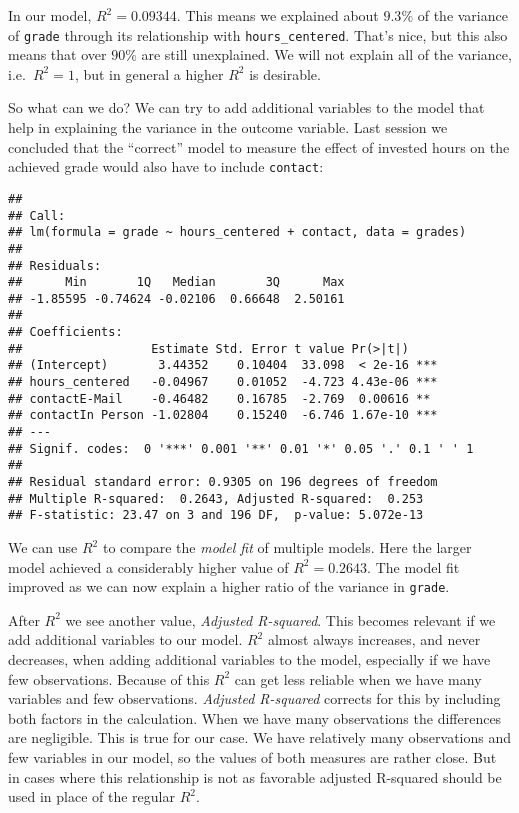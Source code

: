 \documentclass[
]{book}
\begin{document}
In our model, \(R^2 = 0.09344\). This means we explained about \(9.3\%\) of the
variance of \texttt{grade} through its relationship with \texttt{hours\_centered}. That's nice,
but this also means that over \(90\%\) are still unexplained. We will not explain
all of the variance, i.e.~\(R^2 = 1\), but in general a higher \(R^2\) is desirable.

So what can we do? We can try to add additional variables to the model that help
in explaining the variance in the outcome variable. Last session we concluded
that the ``correct'' model to measure the effect of invested hours on the achieved
grade would also have to include \texttt{contact}:

\begin{verbatim}
## 
## Call:
## lm(formula = grade ~ hours_centered + contact, data = grades)
## 
## Residuals:
##      Min       1Q   Median       3Q      Max 
## -1.85595 -0.74624 -0.02106  0.66648  2.50161 
## 
## Coefficients:
##                  Estimate Std. Error t value Pr(>|t|)    
## (Intercept)       3.44352    0.10404  33.098  < 2e-16 ***
## hours_centered   -0.04967    0.01052  -4.723 4.43e-06 ***
## contactE-Mail    -0.46482    0.16785  -2.769  0.00616 ** 
## contactIn Person -1.02804    0.15240  -6.746 1.67e-10 ***
## ---
## Signif. codes:  0 '***' 0.001 '**' 0.01 '*' 0.05 '.' 0.1 ' ' 1
## 
## Residual standard error: 0.9305 on 196 degrees of freedom
## Multiple R-squared:  0.2643, Adjusted R-squared:  0.253 
## F-statistic: 23.47 on 3 and 196 DF,  p-value: 5.072e-13
\end{verbatim}

We can use \(R^2\) to compare the \emph{model fit} of multiple models. Here the larger
model achieved a considerably higher value of \(R^2 = 0.2643\). The model fit
improved as we can now explain a higher ratio of the variance in \texttt{grade}.

After \(R^2\) we see another value, \emph{Adjusted R-squared}. This becomes relevant
if we add additional variables to our model. \(R^2\) almost always increases, and
never decreases, when adding additional variables to the model,
especially if we have few observations. Because of this \(R^2\) can get less
reliable when we have many variables and few observations. \emph{Adjusted R-squared}
corrects for this by including both factors in the calculation. When we have
many observations the differences are negligible. This is true for our case.
We have relatively many observations and few variables in our model, so the
values of both measures are rather close. But in cases where this relationship
is not as favorable adjusted R-squared should be used in place of the regular
\(R^2\).
\end{document}
